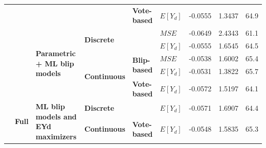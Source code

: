 \documentclass[a4paper,12pt]{article}
\begin{document}
\begin{table}[]
{\begin{tabular}{|l|l|l|l|l|l|l|l|l|}
                                &                                      &                                                              &                                      & \textbf{Vote-based}                  & \textbf{$E[Y_d]$} & -0.0555              & 1.3437                        & 64.9              \\ \cline{3-9} 
                                &                                      & \multirow{5}{*}{\textbf{Parametric + ML blip models}}        & \multicolumn{2}{l|}{\multirow{2}{*}{\textbf{Discrete}}}                     & \textbf{$MSE$}  & -0.0649              & 2.4343                        & 61.1              \\ \cline{6-9} 
                                &                                      &                                                              & \multicolumn{2}{l|}{}                                                       & \textbf{$E[Y_d]$} & -0.0555              & 1.6545                        & 64.5              \\ \cline{4-9} 
                                &                                      &                                                              & \multirow{3}{*}{\textbf{Continuous}} & \multirow{2}{*}{\textbf{Blip-based}} & \textbf{$MSE$}  & -0.0538              & 1.6002                        & 65.4              \\ \cline{6-9} 
                                &                                      &                                                              &                                      &                                      & \textbf{$E[Y_d]$} & -0.0531              & 1.3822                        & 65.7              \\ \cline{5-9} 
                                &                                      &                                                              &                                      & \textbf{Vote-based}                  & \textbf{$E[Y_d]$} & -0.0572              & 1.5197                        & 64.1              \\ \cline{2-9} 
                                & \multirow{4}{*}{\textbf{Full}}       & \multirow{2}{*}{\textbf{ML blip models and EYd maximizers}}  & \multicolumn{2}{l|}{\textbf{Discrete}}                                      & \textbf{$E[Y_d]$} & -0.0571              & 1.6907                        & 64.4              \\ \cline{4-9} 
                                &                                      &                                                              & \textbf{Continuous}                  & \textbf{Vote-based}                  & \textbf{$E[Y_d]$} & -0.0548              & 1.5835                        & 65.3              \\ \cline{3-9} 

\end{tabular}}
\end{table}
\end{document}
